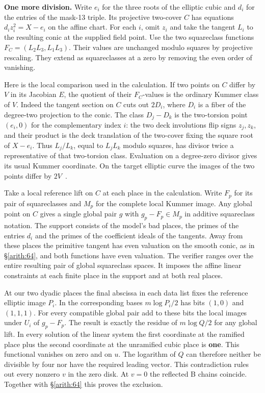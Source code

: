 \textbf{One more division.} Write \(e_i\) for the three roots of the elliptic
cubic and \(d_i\) for the entries of the mask-13 triple. Its projective
two-cover \(C\) has equations \(d_i z_i^2=X-e_i\) on the affine chart.
For each \(i\), omit \(z_i\) and take the tangent \(L_i\) to the resulting
conic at the supplied field point. Use the two squareclass functions
\(F_C=(L_2L_3,L_1L_3)\). Their values are unchanged modulo squares
by projective rescaling. They extend as squareclasses at a zero by
removing the even order of vanishing.

Here is the local comparison used in the calculation. If two points
on \(C\) differ by \(V\) in its Jacobian \(E\), the quotient of their
\(F_C\)-values is the ordinary Kummer class of \(V\). Indeed the
tangent section on \(C\) cuts out \(2D_i\), where \(D_i\) is a fiber
of the degree-two projection to the conic. The class \(D_j-D_k\) is
the two-torsion point \((e_i,0)\) for the complementary index \(i\):
the two deck involutions flip signs \(z_j,z_k\), and their product is
the deck translation of the two-cover fixing the square root of
\(X-e_i\). Thus \(L_j/L_k\), equal to \(L_jL_k\) modulo squares,
has divisor twice a representative of that two-torsion class.
Evaluation on a degree-zero divisor gives its usual Kummer coordinate.
On the target elliptic curve the images of the two points differ by
\(2V\)~\cite{SwinnertonDyer}.

Take a local reference lift on \(C\) at each place in the calculation.
Write \(F_p\) for its pair of squareclasses and \(M_p\) for the complete
local Kummer image. Any global point on \(C\) gives a single global
pair \(g\) with \(g_p-F_p\in M_p\) in additive squareclass notation.
The support consists of the model's bad places, the primes of the
entries \(d_i\) and the primes of the coefficient ideals of the
tangents. Away from these places the primitive tangent has even
valuation on the smooth conic, as in \S\ref{arith:64}, and both functions have
even valuation. The verifier ranges over the entire resulting pair of
global squareclass spaces. It imposes the affine linear constraints
at each finite place in the support and at both real places.

At our two dyadic places the final abscissa in each data list fixes
the reference elliptic image \(P_i\). In the corresponding bases
\(m\log P_i/2\) has bits \((1,0)\) and \((1,1,1)\).
For every compatible global pair add to these bits the local images
under \(U_i\) of \(g_p-F_p\). The result is exactly the residue of
\(m\log Q/2\) for any global lift. In every solution of the linear
system the first coordinate at the ramified place plus the second
coordinate at the unramified cubic place is \textbf{one}. This functional
vanishes on zero and on \(u\). The logarithm of \(Q\) can therefore
neither be divisible by four nor have the required leading vector.
This contradiction rules out every nonzero \(v\) in the zero disk.
At \(v=0\) the reflected B chains coincide. Together with \S\ref{arith:64}
this proves the exclusion.

